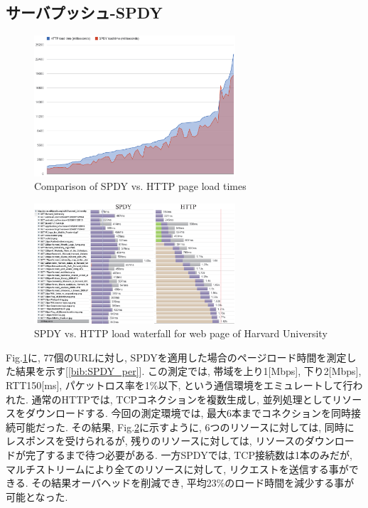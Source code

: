 \documentclass[twocolumn]{jsarticle}
\begin{document}
\subsection{サーバプッシュ-SPDY}
\begin{figure}[h]
  \centering
  \includegraphics[width=7.5cm]{eps/SPDY_graph.eps}
  \caption{Comparison of SPDY vs. HTTP page load times}
  \label{fig:spdy_g1}
\end{figure}
\begin{figure}[h]
  \centering
  \includegraphics[width=7.5cm]{eps/SPDY_chart.eps}
  \caption{SPDY vs. HTTP load waterfall for web page of Harvard University}
  \label{fig:spdy_g2}
\end{figure}
Fig.\ref{fig:spdy_g1}に, 77個のURLに対し,
SPDYを適用した場合のページロード時間を測定した結果を示す[\ref{bib:SPDY_per}].
この測定では, 帯域を上り1[Mbps], 下り2[Mbps], RTT150[ms], パケットロス率を1\%以下,
という通信環境をエミュレートして行われた.
通常のHTTPでは, TCPコネクションを複数生成し, 並列処理としてリソースをダウンロードする.
今回の測定環境では, 最大6本までコネクションを同時接続可能だった.
その結果, Fig.\ref{fig:spdy_g2}に示すように, 6つのリソースに対しては, 同時にレスポンスを受けられるが, 残りのリソースに対しては,
リソースのダウンロードが完了するまで待つ必要がある.
一方SPDYでは, TCP接続数は1本のみだが, マルチストリームにより全てのリソースに対して, リクエストを送信する事ができる.
その結果オーバヘッドを削減でき, 平均23\%のロード時間を減少する事が可能となった.
\end{document}
